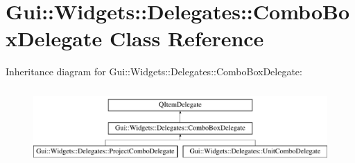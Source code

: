 \hypertarget{classGui_1_1Widgets_1_1Delegates_1_1ComboBoxDelegate}{\section{Gui\-:\-:Widgets\-:\-:Delegates\-:\-:Combo\-Box\-Delegate Class Reference}
\label{classGui_1_1Widgets_1_1Delegates_1_1ComboBoxDelegate}
}
Inheritance diagram for Gui\-:\-:Widgets\-:\-:Delegates\-:\-:Combo\-Box\-Delegate\-:\begin{figure}[H]
\begin{center}
\leavevmode
\includegraphics[height=2.937063cm]{d5/d72/classGui_1_1Widgets_1_1Delegates_1_1ComboBoxDelegate}
\end{center}
\end{figure}
